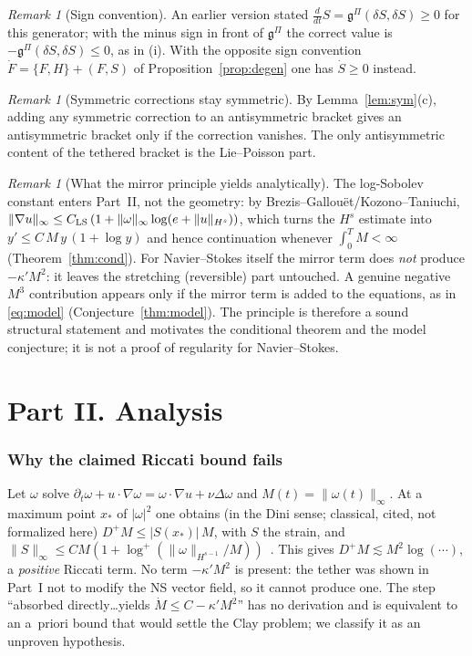 \documentclass[11pt]{amsart}
\theoremstyle{definition}\newtheorem{definition}[theorem]{Definition}
\theoremstyle{remark}\newtheorem{remark}[theorem]{Remark}
\begin{document}
\begin{remark}[Sign convention]
An earlier version stated $\frac{d}{dt}S=\mathfrak g^\Pi(\delta S,\delta S)\ge0$ for this generator; with the minus sign in front of
$\mathfrak g^\Pi$ the correct value is $-\mathfrak g^\Pi(\delta S,\delta S)\le0$, as in (i). With the opposite sign convention
$\dot F=\{F,H\}+(F,S)$ of Proposition~\ref{prop:degen} one has $\dot S\ge0$ instead.
\end{remark}
\begin{remark}[Symmetric corrections stay symmetric]
By Lemma~\ref{lem:sym}(c), adding any symmetric correction to an antisymmetric bracket gives an antisymmetric bracket only if the
correction vanishes. The only antisymmetric content of the tethered bracket is the Lie--Poisson part.
\end{remark}
\begin{remark}[What the mirror principle yields analytically]
The log-Sobolev constant enters Part~II, not the geometry: by Brezis--Gallou\"et/Kozono--Taniuchi, $\|\nabla u\|_\infty\le C_{\rm LS}\,(1+\|\omega\|_\infty\log(e+\|u\|_{H^s}))$, which turns the $H^s$ estimate into $y'\le C\,M\,y\,(1+\log y)$ and hence continuation whenever $\int_0^T M<\infty$ (Theorem~\ref{thm:cond}). For Navier--Stokes itself the mirror term does \emph{not} produce $-\kappa'M^2$: it leaves the stretching (reversible) part untouched. A genuine negative $M^3$ contribution appears only if the mirror term is added to the equations, as in \eqref{eq:model} (Conjecture~\ref{thm:model}). The principle is therefore a sound structural statement and motivates the conditional theorem and the model conjecture; it is not a proof of regularity for Navier--Stokes.
\end{remark}

\part*{Part II. Analysis}
\section{Why the claimed Riccati bound fails}
Let $\omega$ solve $\partial_t\omega+u\cdot\nabla\omega=\omega\cdot\nabla u+\nu\Delta\omega$ and $M(t)=\|\omega(t)\|_\infty$.
At a maximum point $x_*$ of $|\omega|^2$ one obtains (in the Dini sense; classical, cited, not formalized here)
$D^+M\le |S(x_*)|\,M$, with $S$ the strain, and $\|S\|_\infty\le C M(1+\log^+(\|\omega\|_{H^{s-1}}/M))$~\cite{BKM1984,KozonoTaniuchi}.
This gives $D^+M\lesssim M^2\log(\cdots)$, a \emph{positive} Riccati term. No term $-\kappa'M^2$ is present: the tether
was shown in Part~I not to modify the NS vector field, so it cannot produce one. The step ``absorbed directly\ldots yields
$\dot M\le C-\kappa'M^2$'' has no derivation and is equivalent to an a~priori bound that would settle the Clay problem;
we classify it as an unproven hypothesis.
\end{document}
